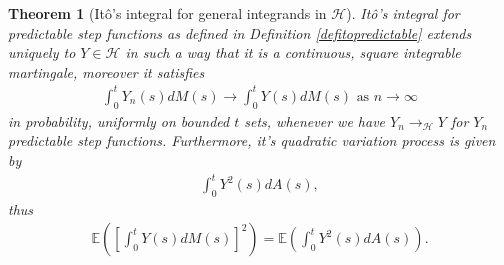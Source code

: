 \documentclass[11pt,a4paper, final]{article}
\newtheorem{thm}{Theorem}[section]
\begin{document}
\begin{thm}[Itô's integral for general integrands in $\mathcal{H}$] Itô's integral for predictable step functions as defined in Definition \ref{defitopredictable} extends uniquely to $Y \in \mathcal{H}$ in such a way that it is a continuous, square integrable martingale, moreover it satisfies 
\begin{align*}
\int_0^t Y_n(s) dM(s) \to \int_0^t Y(s) dM(s) \text{ as } n \to \infty
\end{align*}
in probability, uniformly on bounded $t$ sets, whenever we have $Y_n \to_\mathcal{H} Y$ for $Y_n$ predictable step functions. Furthermore, it's quadratic variation process is given by 
\begin{align*}
\int_0^t Y^2(s) dA(s),
\end{align*}
thus 
\begin{align*}
\mathbb{E} \left( \left[ \int_0^t Y(s) dM(s) \right]^2 \right) = \mathbb{E} \left( \int_0^t Y^2(s) dA(s) \right). 
\end{align*}
\end{thm}
\newpage
\end{document}
